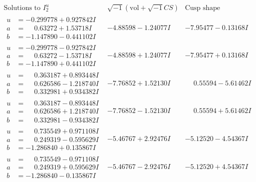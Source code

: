 \documentclass[1p]{elsarticle_modified}
\theoremstyle{definition}
\newcommand{\I}{\sqrt{-1}}
\begin{document}
$$\begin{array}{c|c|c}  
\text{Solutions to }I^u_{2}& \I (\text{vol} + \sqrt{-1}CS) & \text{Cusp shape}\\
 \hline 
\begin{aligned}
u &= -0.299778 + 0.927842 I \\
a &= \phantom{-}0.63272 + 1.53718 I \\
b &= -1.147890 - 0.441102 I\end{aligned}
 & -4.88598 - 1.24077 I & -7.95477 - 0.13168 I \\ \hline\begin{aligned}
u &= -0.299778 - 0.927842 I \\
a &= \phantom{-}0.63272 - 1.53718 I \\
b &= -1.147890 + 0.441102 I\end{aligned}
 & -4.88598 + 1.24077 I & -7.95477 + 0.13168 I \\ \hline\begin{aligned}
u &= \phantom{-}0.363187 + 0.893448 I \\
a &= \phantom{-}0.626586 - 1.218740 I \\
b &= \phantom{-}0.332981 + 0.934382 I\end{aligned}
 & -7.76852 + 1.52130 I & \phantom{-}0.55594 - 5.61462 I \\ \hline\begin{aligned}
u &= \phantom{-}0.363187 - 0.893448 I \\
a &= \phantom{-}0.626586 + 1.218740 I \\
b &= \phantom{-}0.332981 - 0.934382 I\end{aligned}
 & -7.76852 - 1.52130 I & \phantom{-}0.55594 + 5.61462 I \\ \hline\begin{aligned}
u &= \phantom{-}0.735549 + 0.971108 I \\
a &= \phantom{-}0.249319 - 0.595629 I \\
b &= -1.286840 + 0.135867 I\end{aligned}
 & -5.46767 + 2.92476 I & -5.12520 - 4.54367 I \\ \hline\begin{aligned}
u &= \phantom{-}0.735549 - 0.971108 I \\
a &= \phantom{-}0.249319 + 0.595629 I \\
b &= -1.286840 - 0.135867 I\end{aligned}
 & -5.46767 - 2.92476 I & -5.12520 + 4.54367 I \\ \hline\begin{aligned}

\end{aligned}
\end{array}$$
\end{document}
